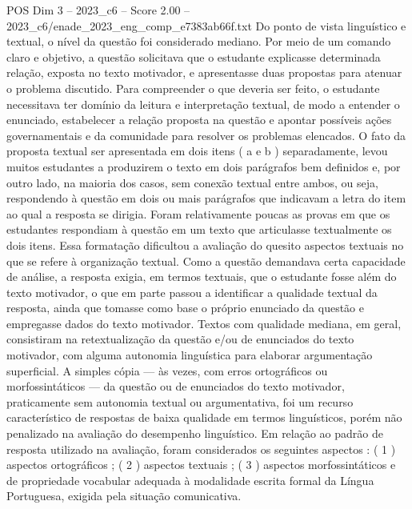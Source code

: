 \begin{textsample}{POS Dim 3 – 2023\_c6 – Score 2.00 – 2023\_c6/enade\_2023\_eng\_comp\_e7383ab66f.txt}
Do ponto de vista linguístico e textual, o nível da questão foi considerado mediano.
Por meio de um comando claro e objetivo, a questão solicitava que o estudante explicasse determinada relação, exposta no texto motivador, e apresentasse duas propostas para atenuar o problema discutido.
Para compreender o que deveria ser feito, o estudante necessitava ter domínio da leitura e interpretação textual, de modo a entender o enunciado, estabelecer a relação proposta na questão e apontar possíveis ações governamentais e da comunidade para resolver os problemas elencados.
O fato da proposta textual ser apresentada em dois itens ( a e b ) separadamente, levou muitos estudantes a produzirem o texto em dois parágrafos bem definidos e, por outro lado, na maioria dos casos, sem conexão textual entre ambos, ou seja, respondendo à questão em dois ou mais parágrafos que indicavam a letra do item ao qual a resposta se dirigia.
Foram relativamente poucas as provas em que os estudantes respondiam à questão em um texto que articulasse textualmente os dois itens.
Essa formatação dificultou a avaliação do quesito aspectos textuais no que se refere à organização textual.
Como a questão demandava certa capacidade de análise, a resposta exigia, em termos textuais, que o estudante fosse além do texto motivador, o que em parte passou a identificar a qualidade textual da resposta, ainda que tomasse como base o próprio enunciado da questão e empregasse dados do texto motivador.
Textos com qualidade mediana, em geral, consistiram na retextualização da questão e/ou de enunciados do texto motivador, com alguma autonomia linguística para elaborar argumentação superficial.
A simples cópia — às vezes, com erros ortográficos ou morfossintáticos — da questão ou de enunciados do texto motivador, praticamente sem autonomia textual ou argumentativa, foi um recurso característico de respostas de baixa qualidade em termos linguísticos, porém não penalizado na avaliação do desempenho linguístico.
Em relação ao padrão de resposta utilizado na avaliação, foram considerados os seguintes aspectos : ( 1 ) aspectos ortográficos ; ( 2 ) aspectos textuais ; ( 3 ) aspectos morfossintáticos e de propriedade vocabular adequada à modalidade escrita formal da Língua Portuguesa, exigida pela situação comunicativa.

\end{textsample}
